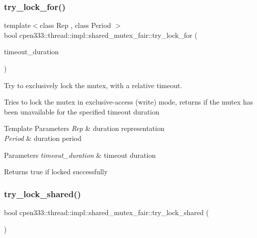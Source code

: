 \subsubsection{\texorpdfstring{try\+\_\+lock\+\_\+for()}{try\_lock\_for()}}
{\footnotesize\ttfamily template$<$class Rep , class Period $>$ \\
bool cpen333\+::thread\+::impl\+::shared\+\_\+mutex\+\_\+fair\+::try\+\_\+lock\+\_\+for (\begin{DoxyParamCaption}\item[{const std\+::chrono\+::duration$<$ Rep, Period $>$ \&}]{timeout\+\_\+duration }\end{DoxyParamCaption})\hspace{0.3cm}{\ttfamily [inline]}}



Try to exclusively lock the mutex, with a relative timeout. 

Tries to lock the mutex in exclusive-\/access (write) mode, returns if the mutex has been unavailable for the specified timeout duration


\begin{DoxyTemplParams}{Template Parameters}
{\em Rep} & duration representation \\
\hline
{\em Period} & duration period \\
\hline
\end{DoxyTemplParams}

\begin{DoxyParams}{Parameters}
{\em timeout\+\_\+duration} & timeout duration \\
\hline
\end{DoxyParams}
\begin{DoxyReturn}{Returns}
true if locked successfully 
\end{DoxyReturn}
\mbox{\label{classcpen333_1_1thread_1_1impl_1_1shared__mutex__fair_aaa17074a3c560ebd8c94a9cee09a1c3f}} 
\subsubsection{\texorpdfstring{try\+\_\+lock\+\_\+shared()}{try\_lock\_shared()}}
{\footnotesize\ttfamily bool cpen333\+::thread\+::impl\+::shared\+\_\+mutex\+\_\+fair\+::try\+\_\+lock\+\_\+shared (\begin{DoxyParamCaption}{ }\end{DoxyParamCaption})\hspace{0.3cm}{\ttfamily [inline]}}



